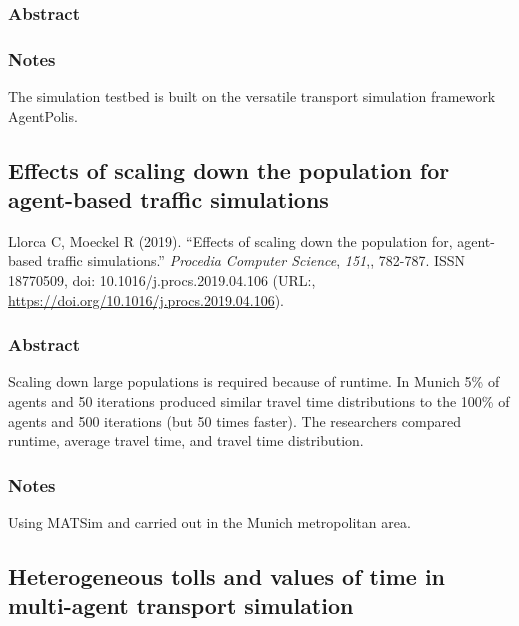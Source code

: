 \documentclass[
]{article}
\begin{document}
\hypertarget{abstract-13}{%
\subsubsection{Abstract}\label{abstract-13}}

\hypertarget{notes-13}{%
\subsubsection{Notes}\label{notes-13}}

The simulation testbed is built on the versatile transport simulation
framework AgentPolis.

\hypertarget{effects-of-scaling-down-the-population-for-agent-based-traffic-simulations}{%
\subsection{Effects of scaling down the population for agent-based
traffic
simulations}\label{effects-of-scaling-down-the-population-for-agent-based-traffic-simulations}}

Llorca C, Moeckel R (2019). ``Effects of scaling down the population
for, agent-based traffic simulations.'' \emph{Procedia Computer
Science}, \emph{151},, 782-787. ISSN 18770509, doi:
10.1016/j.procs.2019.04.106 (URL:,
\url{https://doi.org/10.1016/j.procs.2019.04.106}).

\hypertarget{abstract-14}{%
\subsubsection{Abstract}\label{abstract-14}}

Scaling down large populations is required because of runtime. In Munich
5\% of agents and 50 iterations produced similar travel time
distributions to the 100\% of agents and 500 iterations (but 50 times
faster). The researchers compared runtime, average travel time, and
travel time distribution.

\hypertarget{notes-14}{%
\subsubsection{Notes}\label{notes-14}}

Using MATSim and carried out in the Munich metropolitan area.

\hypertarget{heterogeneous-tolls-and-values-of-time-in-multi-agent-transport-simulation}{%
\subsection{Heterogeneous tolls and values of time in multi-agent
transport
simulation}\label{heterogeneous-tolls-and-values-of-time-in-multi-agent-transport-simulation}}
\end{document}
